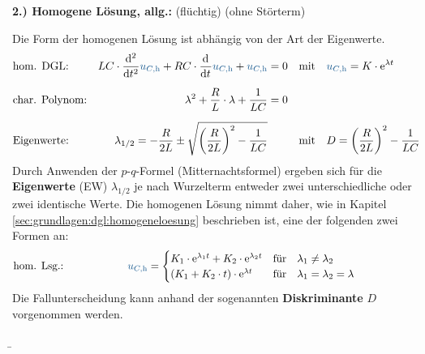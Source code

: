 \begin{frame}
{    \textbf{2.) Homogene Lösung, allg.:} (flüchtig) (ohne Störterm)

    Die Form der homogenen Lösung ist abhängig von der Art der Eigenwerte.
    \begin{align}
        &\text{hom. DGL:}&
            LC \cdot \dt[2] \ecv{u_{C,\mathrm{h}}} + RC \cdot \dt \ecv{u_{C,\mathrm{h}}} + \ecv{u_{C,\mathrm{h}}} &= 0
                &&\text{mit}\quad \ecv{u_{C,\mathrm{h}}} = K \cdot \mathrm{e}^{\lambda t} \label{eq:dgl:rlc:homo}\\[6pt]
        &\text{char. Polynom:}&
            \lambda^2 + \frac{R}{L} \cdot \lambda + \frac{1}{LC} &= 0 \nonumber\\[6pt]
        &\text{Eigenwerte:}&
            \lambda_{1/2} = -\frac{R}{2L} \pm \sqrt{\left(\frac{R}{2L}\right)^2 - \frac{1}{LC}}&
                &&\text{mit}\quad D = \left(\frac{R}{2L}\right)^2 - \frac{1}{LC}
        \label{eq:dgl:rlc:lambda}
    \end{align}
    Durch Anwenden der $p$-$q$-Formel (Mitternachtsformel) ergeben sich für die \textbf{Eigenwerte} (EW) $\lambda_{1/2}$
    je nach Wurzelterm entweder zwei unterschiedliche oder zwei identische Werte.
    Die homogenen Lösung nimmt daher, wie in Kapitel \ref{sec:grundlagen:dgl:homogeneloesung} beschrieben ist, eine der folgenden zwei Formen an:
    \begin{equation}
        \text{hom. Lsg.:}\qquad\qquad\qquad
        \ecv{u_{C,\mathrm{h}}} =
        \begin{cases}
            K_1 \cdot \mathrm{e}^{\lambda_1 t} + K_2 \cdot \mathrm{e}^{\lambda_2 t}  & \text{für}\quad\lambda_1 \neq \lambda_2  \\
            (K_1 + K_2 \cdot t) \cdot \mathrm{e}^{\lambda t} & \text{für}\quad\lambda_1 = \lambda_2 = \lambda
        \end{cases}
        \qquad\qquad\qquad \label{eq:dgl:rlc:homolsg:cases}
    \end{equation}
    Die Fallunterscheidung kann anhand der sogenannten \textbf{Diskriminante} $D$  vorgenommen werden.
}%
\b{%
\begin{minipage}{\textwidth}\centering
    \begin{minipage}[t][3.5cm][]{0.48\textwidth}\centering
        \vspace{5pt}


\end{minipage}
\end{minipage}}
\end{frame}

